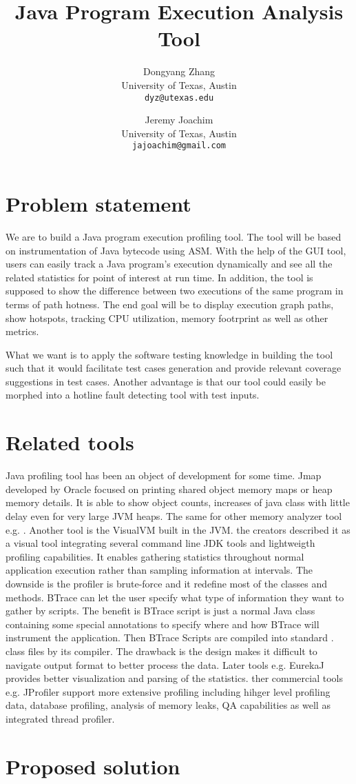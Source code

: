 \documentclass{article}
\title{Java Program Execution Analysis Tool}
\author{
  Dongyang Zhang \\
  {\fontsize{10}{11}\selectfont University of Texas, Austin}\\ 
  \texttt{dyz@utexas.edu}
\and
  Jeremy Joachim \\
  {\fontsize{10}{11}\selectfont University of Texas, Austin}\\ 
  \texttt{jajoachim@gmail.com}
}
\begin{document}
\maketitle
\section{Problem statement}

We are to build a Java program execution profiling tool.
The tool will be based on instrumentation of Java bytecode using ASM.
With the help of the GUI tool, users can easily track a Java program's execution dynamically and see all the related statistics for point of interest at run time.
In addition, the tool is supposed to show the difference between two executions of the same program in terms of path hotness.
The end goal will be to display execution graph paths, show hotspots, tracking CPU utilization, memory footrprint as well as other metrics.

What we want is to apply the software testing knowledge in building the tool such that it would facilitate test cases generation and provide relevant coverage suggestions in test cases.
Another advantage is that our tool could easily be morphed into a hotline fault detecting tool with test inputs.

\section{Related tools}

Java profiling tool has been an object of development for some time.
Jmap \cite{Oraclejmap} developed by Oracle focused on printing shared object memory maps or heap memory details.
It is able to show object counts, increases of java class with little delay even for very large JVM heaps.
The same for other memory analyzer tool e.g. \cite{MAT}.
Another tool is the VisualVM \cite{VisualVM} built in the JVM.
the creators described it as a visual tool integrating several command line JDK tools and lightweigth profiling capabilities.
It enables gathering statistics throughout normal application execution rather than sampling information at intervals.
The downside is the profiler is brute-force and it redefine most of the classes and methods.
BTrace \cite{BTrace} can let the user specify what type of information they want to gather by scripts.
The benefit is BTrace script is just a normal Java class containing some special annotations to specify where and how BTrace will instrument the application.
Then BTrace Scripts are compiled into standard .
class files by its compiler.
The drawback is the design makes it difficult to navigate output format to better process the data.
Later tools e.g. EurekaJ \cite{EurekaJ} provides better visualization and parsing of the statistics.
ther commercial tools e.g. JProfiler \cite{JProfiler} support more extensive profiling including hihger level profiling data, database profiling, analysis of memory leaks, QA capabilities as well as integrated thread profiler.

\section{Proposed solution}




\end{document}
